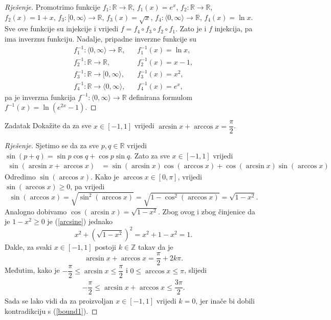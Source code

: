 \begin{proof}[Rješenje]
Promotrimo funkcije \(f_1: \mathbb{R}\to \mathbb{R}\), \(f_1(x)=e^x\), \(f_2 : \mathbb{R}\to \mathbb{R}\), \(f_2(x)=1+x\), \(f_3 : [ 0,\infty\rangle\to \mathbb{R}\), \(f_3(x)=\sqrt{x}\), \(f_4 : \langle 0,\infty\rangle\to \mathbb{R}\), \(f_4(x)=\ln{x}\). Sve ove funkcije su injekcije i vrijedi \(f=f_4\circ f_3\circ f_2\circ f_1\). Zato je i \(f\) injekcija, pa ima inverznu funkciju. Nadalje, pripadne inverzne funkcije su
\begin{align*}
f_1^{-1} : \langle 0, \infty\rangle\to \mathbb{R},&\;\;\; f_1^{-1}(x)=\ln{x},\\
f_2^{-1} : \mathbb{R}\to \mathbb{R},&\;\;\; f_2^{-1}(x)=x-1,\\
f_3^{-1} : \mathbb{R}\to [0, \infty\rangle,&\;\;\; f_3^{-1}(x)=x^2,\\
f_4^{-1} : \mathbb{R}\to \langle 0, \infty\rangle,&\;\;\; f_4^{-1}(x)=e^x,
\end{align*}
pa je inverzna funkcija \(f^{-1} : \langle 0,\infty\rangle\to \mathbb{R}\) definirana formulom \(f^{-1}(x)=\ln(e^{2x}-1)\).
\end{proof}
\begin{exercise}{Zadatak}
Dokažite da za sve \(x\in [-1, 1]\) vrijedi \(\arcsin{x}+\arccos{x}=\dfrac{\pi}{2}\).
\end{exercise}
\begin{proof}[Rješenje]
Sjetimo se da za sve \(p, q\in \mathbb{R}\) vrijedi \(\sin(p+q)=\sin{p}\cos{q}+\cos{p}\sin{q}\). Zato za sve \(x\in [-1, 1]\) vrijedi
\begin{align}
\label{arcsine}
\sin(\arcsin{x}+\arccos{x})&=\sin(\arcsin{x})\cos(\arccos{x})+\cos(\arcsin{x})\sin(\arccos{x})
\end{align}
Odredimo \(\sin(\arccos{x})\). Kako je \(\arccos{x}\in [0, \pi]\), vrijedi \(\sin(\arccos{x})\geq 0\), pa vrijedi
\[\sin(\arccos{x})=\sqrt{\sin^2(\arccos{x})}=\sqrt{1-\cos^2(\arccos{x})}=\sqrt{1-x^2}.\]
Analogno dobivamo \(\cos(\arcsin{x})=\sqrt{1-x^2}\). Zbog ovog i zbog činjenice da je \(1-x^2\geq 0\) je (\ref{arcsine}) jednako
\[x^2+\left(\sqrt{1-x^2}\right)^2=x^2+1-x^2=1.\]
Dakle, za svaki \(x\in [-1, 1]\) postoji \(k\in \mathbb{Z}\) takav da je
\[\arcsin{x}+\arccos{x}=\dfrac{\pi}{2}+2k\pi.\]
Međutim, kako je \(-\dfrac{\pi}{2}\leq \arcsin{x}\leq \dfrac{\pi}{2}\) i \(0\leq \arccos{x}\leq \pi\), slijedi 
\begin{align}
\label{bound1}
-\dfrac{\pi}{2}\leq \arcsin{x}+\arccos{x}\leq \dfrac{3\pi}{2}.
\end{align}
Sada se lako vidi da za proizvoljan \(x\in [-1, 1]\) vrijedi \(k=0\), jer inače bi dobili kontradikciju s (\ref{bound1}).
\end{proof}
